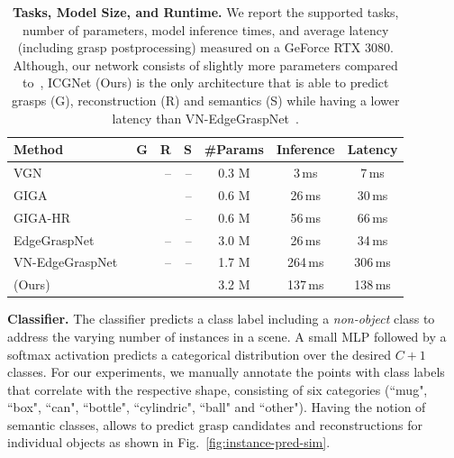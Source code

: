 \documentclass[letterpaper, 10 pt, conference]{ieeeconf}  %
\newcommand{\cmark}{\ding{51}}%
\begin{document}
\begin{table}[t]
    \centering
    \setlength{\tabcolsep}{5pt}
    \begin{tabular}{l|rrr|c|c|c}
    \toprule
    Method & G & R & S & \#Params & Inference & Latency \\ \midrule
        VGN~\cite{Breyer2021VolumetricGN} & \cmark & -- & -- & 0.3 M  & 3\,ms & 7\,ms \\
        GIGA~\cite{Jiang2021SynergiesBA} & \cmark & \cmark & --& 0.6 M & 26\,ms& 30\,ms \\
        GIGA-HR~\cite{Jiang2021SynergiesBA} & \cmark & \cmark & --& 0.6 M & 56\,ms& 66\,ms \\
        EdgeGraspNet~\cite{huang2022edge} & \cmark & -- & --& 3.0 M & 26\,ms& 34\,ms \\
        VN-EdgeGraspNet~\cite{huang2022edge} & \cmark & -- & --& 1.7 M & 264\,ms& 306\,ms \\
        \OurMethod{} (Ours) & \cmark & \cmark & \cmark & 3.2 M & 137\,ms & 138\,ms\\ 
    \bottomrule
    \end{tabular}
    \caption{\textbf{Tasks, Model Size, and Runtime.} We report the supported tasks, number of parameters, model inference times, and average latency (including grasp postprocessing) measured on a GeForce RTX 3080. Although, our network consists of slightly more parameters compared to~\cite{huang2022edge}, ICGNet (Ours) is the only architecture that is able to predict grasps (G), reconstruction (R) and semantics (S) while having a lower latency than VN-EdgeGraspNet~\cite{huang2022edge}.}
    \label{tab:num_paras}
\vspace{-15px}
\end{table}
\noindent\textbf{Classifier.} 
The classifier predicts a class label including a \emph{non-object} class to address the varying number of instances in a scene.
A small MLP followed by a softmax activation predicts a categorical distribution over the desired $C + 1$ classes.
For our experiments, we manually annotate the points with class labels that correlate with the respective shape, consisting of six categories
(``mug", ``box", ``can", ``bottle", ``cylindric", ``ball" and ``other").
Having the notion of semantic classes, allows to predict grasp candidates and reconstructions for individual objects as shown in Fig.~\ref{fig:instance-pred-sim}.
\end{document}

